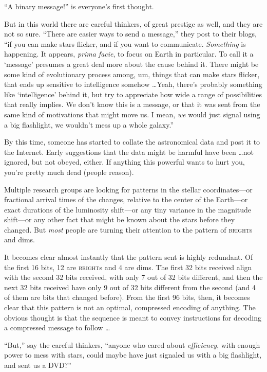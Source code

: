 {
 ``A binary message!'' is
everyone's first thought.}

{
 But in this world there are careful thinkers, of great prestige as
well, and they are not so sure. ``There are easier
ways to send a message,'' they post to their blogs,
``if you can make stars flicker, and if you want to
communicate. \textit{Something} is happening. It appears, \textit{prima
facie}, to focus on Earth in particular. To call it a
`message' presumes a great deal more
about the cause behind it. There might be some kind of evolutionary
process among, um, things that can make stars flicker, that ends up
sensitive to intelligence somehow \ldots Yeah, there's
probably something like `intelligence'
behind it, but try to appreciate how wide a range of possibilities that
really implies. We don't know this is a message, or
that it was sent from the same kind of motivations that might move us.
I mean, \textit{we} would just signal using a big flashlight, we
wouldn't mess up a whole galaxy.''}

{
 By this time, someone has started to collate the astronomical data
and post it to the Internet. Early suggestions that the data might be
harmful have been \ldots not ignored, but not obeyed, either. If
anything this powerful wants to hurt you, you're pretty
much dead (people reason).}

{
 Multiple research groups are looking for patterns in the stellar
coordinates---or fractional arrival times of the changes, relative to
the center of the Earth---or exact durations of the luminosity
shift---or any tiny variance in the magnitude shift---or any other fact
that might be known about the stars before they changed. But
\textit{most} people are turning their attention to the pattern of
\textsc{bright}s and dims.}

{
 It becomes clear almost instantly that the pattern sent is highly
redundant. Of the first 16 bits, 12 are \textsc{bright}s and 4 are dims. The
first 32 bits received align with the second 32 bits received, with
only 7 out of 32 bits different, and then the next 32 bits received
have only 9 out of 32 bits different from the second (and 4 of them are
bits that changed before). From the first 96 bits, then, it becomes
clear that this pattern is not an optimal, compressed encoding of
anything. The obvious thought is that the sequence is meant to convey
instructions for decoding a compressed message to follow \ldots}

{
 ``But,'' say the careful
thinkers, ``anyone who cared about
\textit{efficiency}, with enough power to mess with stars, could maybe
have just signaled us with a big flashlight, and sent us a
DVD?''}

